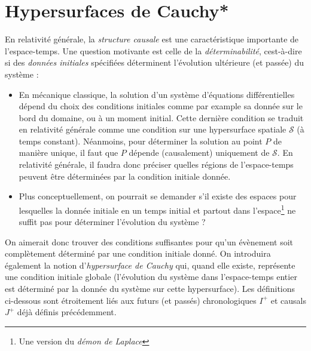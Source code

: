 {\section{Hypersurfaces de Cauchy*}
\label{sec:hypersurfaces cauchy}
En relativité générale, la \emph{structure causale} est une caractéristique importante de l'espace-temps. Une question motivante est celle de la \emph{déterminabilité}, cest-à-dire si des \emph{données initiales} spécifiées déterminent l'évolution ultérieure (et passée) du système :
\begin{itemize}
    \item En mécanique classique, la solution d'un système d'équations différentielles dépend du choix des conditions initiales comme par example sa donnée sur le bord du domaine, ou à un moment initial. Cette dernière condition se traduit en relativité générale comme une condition sur une hypersurface spatiale $\mathcal{S}$ (à temps constant). Néanmoins, pour déterminer la solution au point $P$ de manière unique, il faut que $P$ dépende (causalement) uniquement de $\mathcal{S}$. En relativité générale, il faudra donc préciser quelles régions de l'espace-temps peuvent être déterminées par la condition initiale donnée.
    \item Plus conceptuellement, on pourrait se demander s'il existe des espaces pour lesquelles la donnée initiale en un temps initial et partout dans l'espace\footnote{Une version du \emph{démon de Laplace}} ne suffit pas pour déterminer l'évolution du système ? 
\end{itemize}
On aimerait donc trouver des conditions suffisantes pour qu'un évènement soit complètement déterminé par une condition initiale donné. On introduira également la notion d'\emph{hypersurface de Cauchy} qui, quand elle existe, représente une condition initiale globale (l'évolution du système dans l'espace-temps entier est déterminé par la donnée du système sur cette hypersurface). Les définitions ci-dessous sont étroitement liés aux futurs (et passés) chronologiques $I^+$ et causals $J^+$ déjà définis précédemment.

}
